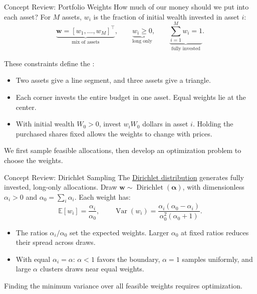 \documentclass[aspectratio=169,11pt]{beamer}
\newcommand{\E}{\mathbb{E}}
\newcommand{\Var}{\operatorname{Var}}
\newcommand{\bw}{\mathbf{w}}
\begin{document}
\begin{frame}{Concept Review: Portfolio Weights}
  How much of our money should we put into each asset? For $M$ assets,
  $w_i$ is the fraction of initial wealth invested in asset $i$:
  \[
    \underbrace{\bw=[w_1,\ldots,w_M]^{\top}}_{\text{mix of assets}},
    \qquad
    \underbrace{w_i\ge0}_{\text{long only}},
    \qquad
    \underbrace{\sum_{i=1}^{M}w_i=1}_{\text{fully invested}}.
  \]

  These constraints define the :
  \begin{itemize}\setlength{\itemsep}{0.6em}
    \item Two assets give a line segment, and three assets give a triangle.
    \item Each corner invests the entire budget in one asset. Equal weights
      lie at the center.
    \item With initial wealth $W_0>0$, invest $w_iW_0$ dollars in asset $i$.
      Holding the purchased shares fixed allows the weights to change with prices.
  \end{itemize}

  \vspace{0.5em}
  We first sample feasible allocations, then develop an optimization problem
  to choose the weights.
\end{frame}

\begin{frame}{Concept Review: Dirichlet Sampling}
  The \href{https://en.wikipedia.org/wiki/Dirichlet_distribution}{Dirichlet distribution}
  generates fully invested, long-only allocations.
  Draw $\bw\sim\operatorname{Dirichlet}(\boldsymbol{\alpha})$, with
  dimensionless $\alpha_i>0$ and $\alpha_0=\sum_i\alpha_i$.
  Each weight has:
  \[
    \boxed{\E[w_i]=\frac{\alpha_i}{\alpha_0}},
    \qquad
    \boxed{\Var(w_i)=\frac{\alpha_i(\alpha_0-\alpha_i)}
      {\alpha_0^2(\alpha_0+1)}}.
  \]
  \begin{itemize}\setlength{\itemsep}{0.35em}
    \item The ratios $\alpha_i/\alpha_0$ set the expected weights. Larger
      $\alpha_0$ at fixed ratios reduces their spread across draws.
    \item With equal $\alpha_i=\alpha$: $\alpha<1$ favors the boundary,
      $\alpha=1$ samples uniformly, and large $\alpha$ clusters draws near equal weights.
  \end{itemize}

  Finding the minimum variance over all feasible weights requires optimization.
\end{frame}
\end{document}
